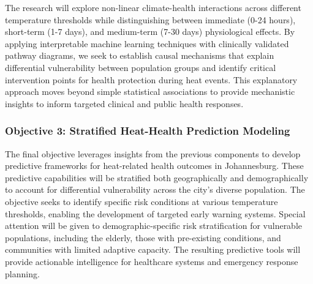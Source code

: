 The research will explore non-linear climate-health interactions across different temperature thresholds while distinguishing between immediate (0-24 hours), short-term (1-7 days), and medium-term (7-30 days) physiological effects. By applying interpretable machine learning techniques with clinically validated pathway diagrams, we seek to establish causal mechanisms that explain differential vulnerability between population groups and identify critical intervention points for health protection during heat events. This explanatory approach moves beyond simple statistical associations to provide mechanistic insights to inform targeted clinical and public health responses.

\subsubsection{Objective 3: Stratified Heat-Health Prediction Modeling}
The final objective leverages insights from the previous components to develop predictive frameworks for heat-related health outcomes in Johannesburg. These predictive capabilities will be stratified both geographically and demographically to account for differential vulnerability across the city's diverse population. The objective seeks to identify specific risk conditions at various temperature thresholds, enabling the development of targeted early warning systems. Special attention will be given to demographic-specific risk stratification for vulnerable populations, including the elderly, those with pre-existing conditions, and communities with limited adaptive capacity. The resulting predictive tools will provide actionable intelligence for healthcare systems and emergency response planning.

